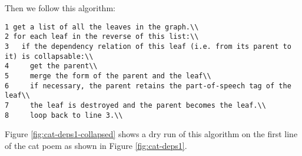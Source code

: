 Then we follow this algorithm:\\
\begin{verbatim}
1 get a list of all the leaves in the graph.\\
2 for each leaf in the reverse of this list:\\
3   if the dependency relation of this leaf (i.e. from its parent to it) is collapsable:\\
4     get the parent\\
5     merge the form of the parent and the leaf\\
6     if necessary, the parent retains the part-of-speech tag of the leaf\\
7     the leaf is destroyed and the parent becomes the leaf.\\
8     loop back to line 3.\\
\end{verbatim}

Figure \ref{fig:cat-deps1-collapsed} shows a dry run of this algorithm on the first line of the cat poem as shown in Figure \ref{fig:cat-deps1}.

